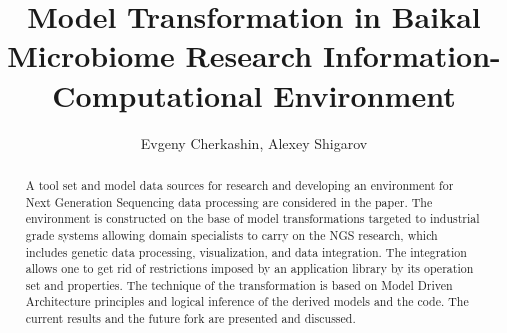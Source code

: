 \documentclass[a4paper]{jpconf}
\begin{document}
\title{Model Transformation in Baikal Microbiome Research Information-Computational Environment}

\author{Evgeny Cherkashin, Alexey Shigarov}

\address{Matrosov Institute for System Dynamics and Control Theory, Siberian Branch of Russian Academy of Sciences, Irkutsk, Russia}





\begin{abstract}%
A tool set and model data sources for research and developing an environment for Next Generation Sequencing data processing are considered in the paper.  The environment is constructed on the base of model transformations targeted to industrial grade systems allowing domain specialists to carry on the NGS research, which includes genetic data processing, visualization, and data integration.  The integration allows one to get rid of restrictions imposed by an application library by its operation set and properties.  The technique of the transformation is based on Model Driven Architecture principles and logical inference of the derived models and the code.  The current results and the future fork are presented and discussed.
\end{abstract}
\end{document}
